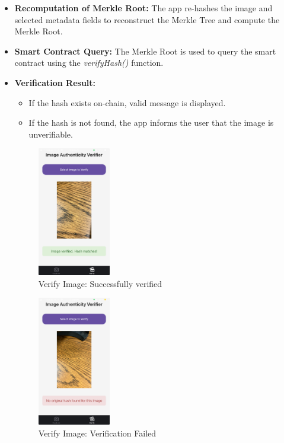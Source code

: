 \begin{itemize}
    
    \item {\textbf{Recomputation of Merkle Root: }} The app re-hashes the image and selected metadata fields to reconstruct the Merkle Tree and compute the Merkle Root.
    \item {\textbf{Smart Contract Query:}} The Merkle Root is used to query the smart contract using the \textit{verifyHash()} function.
    \item {\textbf{Verification Result:}}
        \begin{itemize}
            \item If the hash exists on-chain, valid message is displayed.
            \item If the hash is not found, the app informs the user that the image is unverifiable.
        \end{itemize}
        \begin{figure}[H]
            \centering
            \includegraphics[width=0.30\textwidth]{images/verifySuccess.jpeg}
            \caption{Verify Image:  Successfully verified}
            \label{fig:verificationResultSuccess}
        \end{figure}

        \begin{figure}[H]
            \centering
            \includegraphics[width=0.30\textwidth]{images/verifyFailed.jpeg}
            \caption{Verify Image: Verification Failed}
            \label{fig:verificationResultFailed}
        \end{figure}
\end{itemize}



